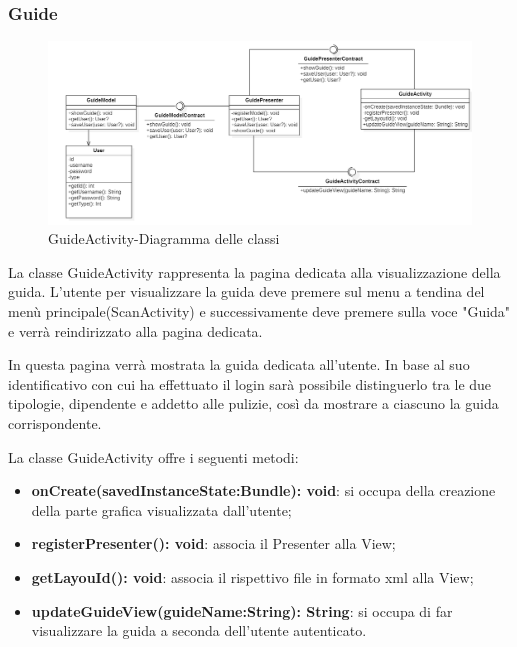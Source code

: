 \subsubsection{Guide}
\begin{figure}[H]
	\centering
	\includegraphics[width=16cm]{res/images/GuideClass.png}
	\caption{GuideActivity-Diagramma delle classi}
	\label{fig:GuideActivity-Diagramma delle classi}
\end{figure}
La classe GuideActivity rappresenta la pagina dedicata alla visualizzazione della guida.
L'utente per visualizzare la guida deve premere sul menu a tendina del menù principale(ScanActivity) e successivamente deve premere sulla voce "Guida" e verrà reindirizzato alla pagina dedicata.

In questa pagina verrà mostrata la guida dedicata all'utente. In base al suo identificativo con cui ha effettuato il login sarà possibile distinguerlo tra le due tipologie, dipendente e addetto alle pulizie, così da mostrare a ciascuno la guida corrispondente.

La classe GuideActivity offre i seguenti metodi:
\begin{itemize}
	\item \textbf{onCreate(savedInstanceState:Bundle): void}: si occupa della creazione della parte grafica visualizzata dall'utente;
	\item \textbf{registerPresenter(): void}: associa il Presenter alla View;
	\item \textbf{getLayouId(): void}: associa il rispettivo file in formato xml alla View;
	\item \textbf{updateGuideView(guideName:String): String}: si occupa di far visualizzare la guida a seconda dell'utente autenticato. 
\end{itemize}

